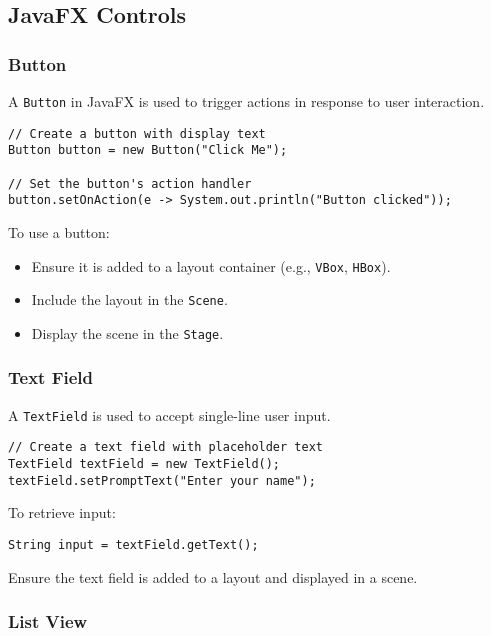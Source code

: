 \documentclass{article}
\newcommand{\codecmd}[1]{\textcolor[rgb]{0,0.5,0}{\texttt{#1}}}
\begin{document}
\subsection{JavaFX Controls}

\subsubsection{Button}

A \codecmd{Button} in JavaFX is used to trigger actions in response to user interaction.

\begin{verbatim}
// Create a button with display text
Button button = new Button("Click Me");

// Set the button's action handler
button.setOnAction(e -> System.out.println("Button clicked"));
\end{verbatim}

To use a button:
\begin{itemize}
    \item Ensure it is added to a layout container (e.g., \codecmd{VBox}, \codecmd{HBox}).
    \item Include the layout in the \codecmd{Scene}.
    \item Display the scene in the \codecmd{Stage}.
\end{itemize}

\subsubsection{Text Field}

A \codecmd{TextField} is used to accept single-line user input.

\begin{verbatim}
// Create a text field with placeholder text
TextField textField = new TextField();
textField.setPromptText("Enter your name");
\end{verbatim}

\noindent To retrieve input:
\begin{verbatim}
String input = textField.getText();
\end{verbatim}

Ensure the text field is added to a layout and displayed in a scene.

\subsubsection{List View}
\end{document}
